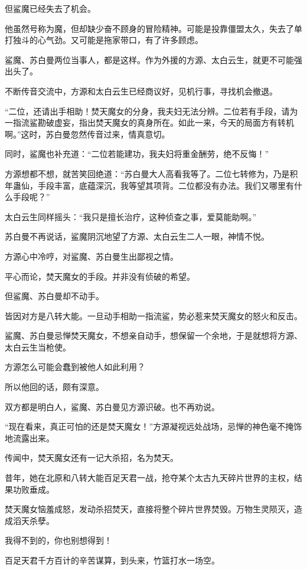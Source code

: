 \begin{this_body}
但鲨魔已经失去了机会。

他虽然号称为魔，但却缺少奋不顾身的冒险精神。可能是投靠僵盟太久，失去了单打独斗的心气劲。又可能是拖家带口，有了许多顾虑。

鲨魔、苏白曼两位当事人，都是这样。作为外援的方源、太白云生，就更不可能强出头了。

不断传音交流中，方源和太白云生已经商议好，见机行事，寻找机会撤退。

“二位，还请出手相助！焚天魔女的分身，我夫妇无法分辨。二位若有手段，请为一指流鲨勘破虚妄，指出焚天魔女的真身所在。如此一来，今天的局面方有转机啊。”这时，苏白曼忽然传音过来，情真意切。

同时，鲨魔也补充道：“二位若能建功，我夫妇将重金酬劳，绝不反悔！”

方源想都不想，就苦笑回绝道：“苏白曼大人高看我等了。二位七转修为，乃是积年蛊仙，手段丰富，底蕴深沉，我等望其项背。二位都没有办法。我们又哪里有什么手段呢？”

太白云生同样摇头：“我只是擅长治疗，这种侦查之事，爱莫能助啊。”

苏白曼不再说话，鲨魔阴沉地望了方源、太白云生二人一眼，神情不悦。

方源心中冷哼，对鲨魔、苏白曼生出鄙视之情。

平心而论，焚天魔女的手段。并非没有侦破的希望。

但鲨魔、苏白曼却不动手。

皆因对方是八转大能。一旦动手相助一指流鲨，势必惹来焚天魔女的怒火和反击。

鲨魔、苏白曼忌惮焚天魔女，不想亲自动手，想保留一个余地，于是就想将方源、太白云生当枪使。

方源怎么可能会蠢到被他人如此利用？

所以他回的话，颇有深意。

双方都是明白人，鲨魔、苏白曼见方源识破。也不再劝说。

“现在看来，真正可怕的还是焚天魔女！”方源凝视远处战场，忌惮的神色毫不掩饰地流露出来。

传闻中，焚天魔女还有一记大杀招，名为焚天。

昔年，她在北原和八转大能百足天君一战，抢夺某个太古九天碎片世界的主权，结果功败垂成。

焚天魔女恼羞成怒，发动杀招焚天，直接将整个碎片世界焚毁。万物生灵陨灭，造成滔天杀孽。

我得不到的，你也别想得到！

百足天君千方百计的辛苦谋算，到头来，竹篮打水一场空。


\end{this_body}
